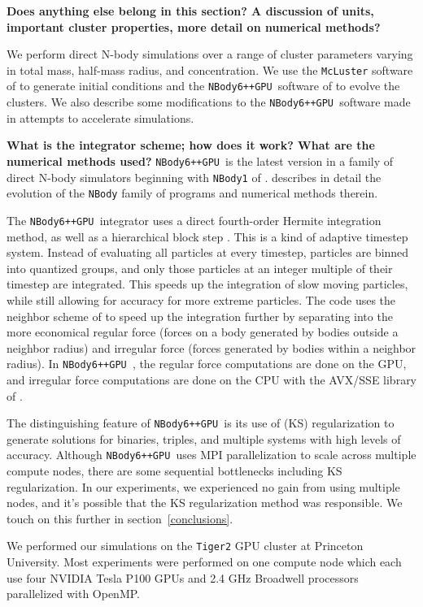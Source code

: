 \documentclass[preprint1]{aastex}
\newcommand\nbody{\texttt{NBody6++GPU }}
\numberwithin{equation}{section}
\begin{document}
\textbf{Does anything else belong in this section?  A discussion of units, important cluster properties, more detail on numerical methods?}

We perform direct N-body simulations over a range of cluster parameters varying in total mass, half-mass radius, and concentration.  We use the \texttt{McLuster} software of \citet{2011Kupper} to generate initial conditions and the \nbody software of \citet{2015Wang} to evolve the clusters. We also describe some modifications to the \nbody software made in attempts to accelerate simulations.

\textbf{What is the integrator scheme; how does it work?  What are the numerical methods used?}
\nbody is the latest version in a family of direct N-body simulators beginning with \texttt{NBody1} of \citet{1963Aarseth}. \citet{1999Aarseth} describes in detail the evolution of the \texttt{NBody} family of programs and numerical methods therein.

The \nbody integrator uses a direct fourth-order Hermite integration method, as well as a hierarchical block step \citep[][and refs within]{2015Wang}. This is a kind of adaptive timestep system. Instead of evaluating all particles at every timestep, particles are binned into quantized groups, and only those particles at an integer multiple of their timestep are integrated. This speeds up the integration of slow moving particles, while still allowing for accuracy for more extreme particles. The code uses the neighbor scheme of \citet{1973Ahmad} to speed up the integration further by separating into the more economical regular force (forces on a body generated by bodies outside a neighbor radius) and irregular force (forces generated by bodies within a neighbor radius). In \nbody, the regular force computations are done on the GPU, and irregular force computations are done on the CPU with the AVX/SSE library of \citet{2012Nitadori}.

The distinguishing feature of \nbody is its use of \citet{1965Kusta} (KS) regularization to generate solutions for binaries, triples, and multiple systems with high levels of accuracy. Although \nbody uses MPI parallelization to scale across multiple compute nodes, there are some sequential bottlenecks including KS regularization. In our experiments, we experienced no gain from using multiple nodes, and it's possible that the KS regularization method was responsible. We touch on this further in section~\ref{conclusions}.

We performed our simulations on the \texttt{Tiger2} GPU cluster at Princeton University. Most experiments were performed on one compute node which each use four NVIDIA Tesla P100 GPUs and 2.4 GHz Broadwell processors parallelized with OpenMP.
\end{document}
